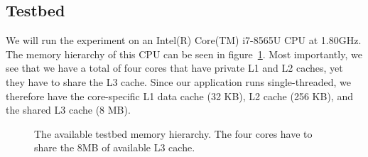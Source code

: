 \documentclass{article}
\begin{document}
\subsection{Testbed}
We will run the experiment on an Intel(R) Core(TM) i7-8565U CPU at 1.80GHz. The memory hierarchy of this CPU can be seen in figure~\ref{fig:topo}. Most importantly, we see that we have a total of four cores that have private L1 and L2 caches, yet they have to share the L3 cache. Since our application runs single-threaded, we therefore have the core-specific L1 data cache (32 KB), L2 cache (256 KB), and the shared L3 cache (8 MB). 
\begin{figure}[H]
  \centering
  \resizebox{0.7\linewidth}{!}{}
  \caption[Testbed Memory Hierarchy]{The available testbed memory hierarchy. The four cores have to share the  8MB of available L3 cache.}
  \label{fig:topo}
\end{figure}
\end{document}
